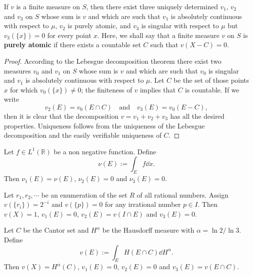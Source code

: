 \begin{theorem}
  \label{thm: Lebesgue decomposition theorem}
  If $v$ is a finite measure on $S$, 
  then there exist three uniquely determined $v_1$, $v_2$ and $v_3$ on $S$
  whose sum is $v$ and which are such that $v_1$ is absolutely continuous with respect to $\mu$, 
  $v_2$ is purely atomic, 
  and $v_3$ is singular with respect to $\mu$ but $v_3(\{x\}) = 0$ for every point $x$.
  Here, we shall say that a finite measure $v$ on $S$ is \textbf{purely atomic} 
  if there exists a countable set $C$ such that $v(X-C) = 0$.
\end{theorem}

\begin{proof}
  According to the Lebesgue decomposition theorem there exist two measures $v_0$ and $v_1$ on $S$ 
  whose sum is $v$ and which are such that $v_0$ is singular 
  and $v_1$ is absolutely continuous with respect to $\mu$.
  Let $C$ be the set of those points $x$ for which $v_0(\{x\}) \neq 0$; the finiteness of $v$ implies that 
  $C$ is countable. If we write 
  \[
  v_2(E) = v_0(E\cap C) \quad \text{and}\quad v_3(E) = v_0(E-C),
  \]
  then it is clear that the decomposition $v = v_1 + v_2 + v_3$ has all the desired properties.
  Uniqueness follows from the uniqueness of the Lebesgue decomposition 
  and the easily verifiable uniqueness of $C$.
\end{proof}

\begin{example}
  Let $f\in L^1(\mathbb R)$ be a non negative function. 
  Define 
  \[
  \nu(E) := \int_Ef\dd x.
  \]
  Then $\nu_1(E) = \nu(E)$, $\nu_2(E) = 0$ and $\nu_3(E) = 0$.

  Let $r_1, r_2, \cdots$ be an enumeration of the set $R$ of all rational numbers. 
  Assign $v(\{r_i\}) = 2^{-i}$ and $v(\{p\}) = 0$ for any irrational number $p\in I$.
  Then $v(X) = 1$, $v_1(E) = 0$, $v_2(E) = v(I\cap E)$ and $v_3(E) = 0$.

  Let $C$ be the Cantor set and $H^{\alpha}$ be the Hausdorff measure with $\alpha=\ln 2/\ln3$.
  Define 
  \[
  v(E) := \int_E H(E\cap C)\dd H^\alpha.
  \]
  Then $v(X) = H^\alpha(C)$, $v_1(E) = 0$, $v_2(E) = 0$ and $v_3(E) = v(E\cap C)$.
\end{example}

